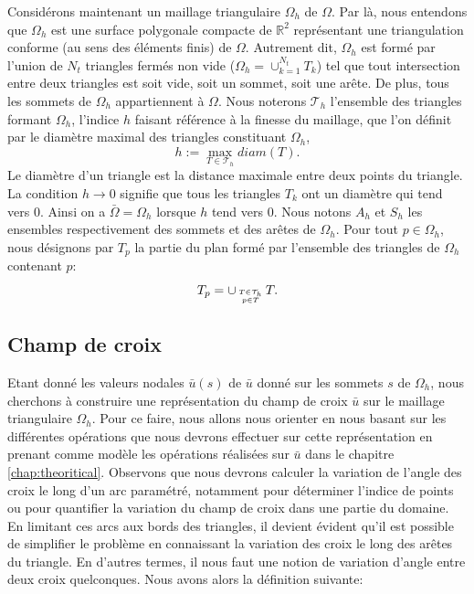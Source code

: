 Considérons maintenant un maillage triangulaire $\Omega_h$ de $\Omega$. Par là, nous entendons que $\Omega_h$ est une surface polygonale compacte de $\mathbb{R}^2$ représentant une triangulation conforme (au sens des éléments finis) de $\Omega$. Autrement dit, $\Omega_h$ est formé par l'union de $N_t$ triangles fermés non vide ($\Omega_h=\cup_{k=1}^{N_t}T_k$) tel que tout intersection entre deux triangles est soit vide, soit un sommet, soit une arête. De plus, tous les sommets de $\Omega_h$ appartiennent à $\Omega$. Nous noterons $\mathcal{T}_h$ l'ensemble des triangles formant $\Omega_h$, l'indice $h$ faisant référence à la finesse du maillage, que l’on définit par le diamètre maximal des triangles constituant $\Omega_h$,
$$
h:=\max_{T\in\mathcal{T}_h} diam(T).
$$
Le diamètre d’un triangle est la distance maximale entre deux points du triangle. La condition $h\rightarrow 0$ signifie que tous les triangles $T_k$ ont un diamètre qui tend vers $0$. Ainsi on a $\bar{\Omega}=\Omega_h$ lorsque $h$ tend vers $0$. Nous notons $A_h$ et $S_h$ les ensembles respectivement des sommets et des arêtes de $\Omega_h$. Pour tout $p\in\Omega_h$, nous désignons par $T_p$ la partie du plan formé par l'ensemble des triangles de $\Omega_h$ contenant $p$:
$$T_p=\displaystyle\cup_{T\in\mathcal{T}_h\atop~p\in T~}T.$$

\subsection{Champ de croix}
\label{subsec:discr_champ_de_croix}

Etant donné les valeurs nodales $\bar{u}(s)$ de $\bar{u}$ donné sur les sommets $s$ de $\Omega_h$, nous cherchons à construire une représentation du champ de croix $\bar{u}$ sur le maillage triangulaire $\Omega_h$. Pour ce faire, nous allons nous orienter en nous basant sur les différentes opérations que nous devrons effectuer sur cette représentation en prenant comme modèle les opérations réalisées sur $\bar{u}$ dans le chapitre \ref{chap:theoritical}. Observons que nous devrons calculer la variation de l'angle des croix le long d'un arc paramétré, notamment pour déterminer l'indice de points ou pour quantifier la variation du champ de croix dans une partie du domaine. En limitant ces arcs aux bords des triangles, il devient évident qu'il est possible de simplifier le problème en connaissant la variation des croix le long des arêtes du triangle. En d'autres termes, il nous faut une notion de variation d'angle entre deux croix quelconques. Nous avons alors la définition suivante:

